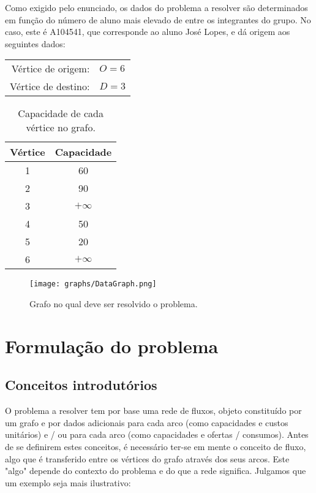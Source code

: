 \documentclass[12pt, a4paper, titlepage]{article}
\begin{document}
Como exigido pelo enunciado, os dados do problema a resolver são determinados em função do número de
aluno mais elevado de entre os integrantes do grupo. No caso, este é A104541, que corresponde ao
aluno José Lopes, e dá origem aos seguintes dados:

\begin{center}
    \begin{tabular}{rl}
        Vértice de origem:  & $O = 6$ \\
        Vértice de destino: & $D = 3$
    \end{tabular}
\end{center}

\begin{table}[H]
    \begin{center}
        \begin{tabular}{c|c}
            Vértice & Capacidade \\
            \hline
            1 & 60        \\
            2 & 90        \\
            3 & $+\infty$ \\
            4 & 50        \\
            5 & 20        \\
            6 & $+\infty$
        \end{tabular}
    \end{center}
    \caption{Capacidade de cada vértice no grafo.}
    \label{vertices-capacities}
\end{table}

\begin{figure}[H]
    \centering
    \texttt{[image: graphs/DataGraph.png]}
    \caption{Grafo no qual deve ser resolvido o problema.}
    \label{data-graph}
\end{figure}

\pagebreak
\section{Formulação do problema}

\subsection{Conceitos introdutórios}

O problema a resolver tem por base uma rede de fluxos, objeto constituído por um grafo e por dados
adicionais para cada arco (como capacidades e custos unitários) e / ou para cada arco (como
capacidades e ofertas / consumos). Antes de se definirem estes conceitos, é necessário ter-se em
mente o conceito de fluxo, algo que é transferido entre os vértices do grafo através dos seus arcos.
Este "algo"{} depende do contexto do problema e do que a rede significa. Julgamos que um exemplo
seja mais ilustrativo:
\end{document}
